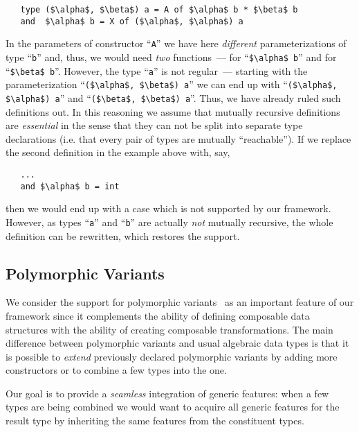 \begin{lstlisting}
   type ($\alpha$, $\beta$) a = A of $\alpha$ b * $\beta$ b
   and  $\alpha$ b = X of ($\alpha$, $\alpha$) a
\end{lstlisting}

In the parameters of constructor ``\lstinline{A}'' we have here \emph{different} parameterizations of type ``\lstinline{b}'' and, thus, we would need
\emph{two} functions~--- for ``\lstinline{$\alpha$ b}'' and for ``\lstinline{$\beta$ b}''. However, the type ``\lstinline{a}'' is not regular~--- starting with 
the parameterization ``\lstinline{($\alpha$, $\beta$) a}'' we can end up with ``\lstinline{($\alpha$, $\alpha$) a}'' and ``\lstinline{($\beta$, $\beta$) a}''.
Thus, we have already ruled such definitions out. In this reasoning we assume that mutually recursive definitions are \emph{essential} in the sense that they
can not be split into separate type declarations (i.e. that every pair of types are mutually ``reachable''). If we replace the second definition in the
example above with, say,

\begin{lstlisting}
   ...
   and $\alpha$ b = int
\end{lstlisting}

then we would end up with a case which is not supported by our framework. However, as types ``\lstinline{a}'' and ``\lstinline{b}'' are actually \emph{not}
mutually recursive, the whole definition can be rewritten, which restores the support.

\subsection{Polymorphic Variants}
\label{pv}

We consider the support for polymorphic variants~\cite{PolyVar,PolyVarReuse} as an important feature of our framework since it complements the ability of defining
composable data structures with the ability of creating composable transformations. The main difference between polymorphic variants and usual algebraic
data types is that it is possible to \emph{extend} previously declared polymorphic variants by adding more constructors or to combine a few types into the one. 

Our goal is to provide a \emph{seamless} integration of generic features: when a few types are being combined we would want to acquire all generic
features for the result type by inheriting the same features from the constituent types.



